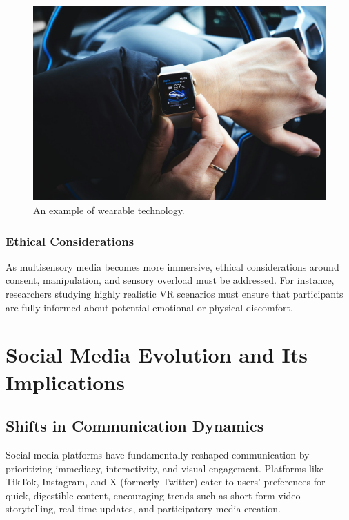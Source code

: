 \documentclass[
]{book}
\begin{document}
\begin{figure}
\centering
\includegraphics[width=1\textwidth,height=\textheight]{images/wearable.jpg}
\caption{An example of wearable technology.}
\end{figure}

\subsubsection{Ethical Considerations}\label{ethical-considerations}

As multisensory media becomes more immersive, ethical considerations around consent, manipulation, and sensory overload must be addressed. For instance, researchers studying highly realistic VR scenarios must ensure that participants are fully informed about potential emotional or physical discomfort.

\section{Social Media Evolution and Its Implications}\label{social-media-evolution-and-its-implications}

\subsection{Shifts in Communication Dynamics}\label{shifts-in-communication-dynamics}

Social media platforms have fundamentally reshaped communication by prioritizing immediacy, interactivity, and visual engagement. Platforms like TikTok, Instagram, and X (formerly Twitter) cater to users' preferences for quick, digestible content, encouraging trends such as short-form video storytelling, real-time updates, and participatory media creation.
\end{document}
